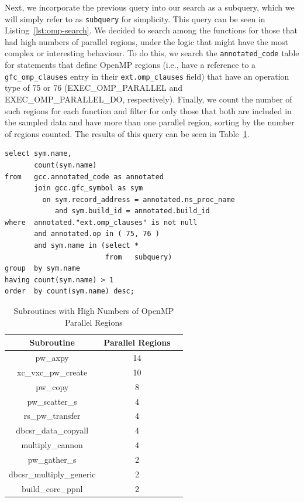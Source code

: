 Next, we incorporate the previous query into our search as a subquery, which we will simply refer to as \texttt{subquery} for simplicity.
This query can be seen in Listing~\ref{lst:omp-search}.
We decided to search among the functions for those that had high numbers of parallel regions, under the logic that might have the most complex or interesting behaviour.
To do this, we search the \texttt{annotated\_code} table for statements that define OpenMP regions (i.e., have a reference to a \texttt{gfc\_omp\_clauses} entry in their \texttt{ext.omp\_clauses} field) that have an operation type of 75 or 76 (EXEC\_OMP\_PARALLEL and EXEC\_OMP\_PARALLEL\_DO, respectively).
Finally, we count the number of such regions for each function and filter for only those that both are included in the sampled data and have more than one parallel region, sorting by the number of regions counted.
The results of this query can be seen in Table~\ref{tbl:parallel-regions}.

\begin{lstlisting}[caption=Finding High Concentrations of OpenMP Parallel Regions, label=lst:omp-search]
select sym.name,
       count(sym.name)
from   gcc.annotated_code as annotated
       join gcc.gfc_symbol as sym
         on sym.record_address = annotated.ns_proc_name
            and sym.build_id = annotated.build_id
where  annotated."ext.omp_clauses" is not null
       and annotated.op in ( 75, 76 )
       and sym.name in (select *
                        from   subquery)
group  by sym.name
having count(sym.name) > 1
order  by count(sym.name) desc;  
\end{lstlisting}

\begin{table}[htbp]
\caption{Subroutines with High Numbers of OpenMP Parallel Regions}
\begin{center}
\begin{tabular}{|c|c|c|}
\hline
\textbf{Subroutine} & \textbf{Parallel Regions} \\
\hline
pw\_axpy & 14 \\
\hline
xc\_vxc\_pw\_create & 10 \\
\hline
pw\_copy & 8 \\
\hline
pw\_scatter\_s & 4 \\
\hline
rs\_pw\_transfer & 4 \\
\hline
dbcsr\_data\_copyall & 4 \\
\hline
multiply\_cannon & 4 \\
\hline
pw\_gather\_s & 2 \\
\hline
dbcsr\_multiply\_generic & 2 \\
\hline
build\_core\_ppnl & 2 \\
\hline
\end{tabular}
\label{tbl:parallel-regions}
\end{center}
\end{table}

